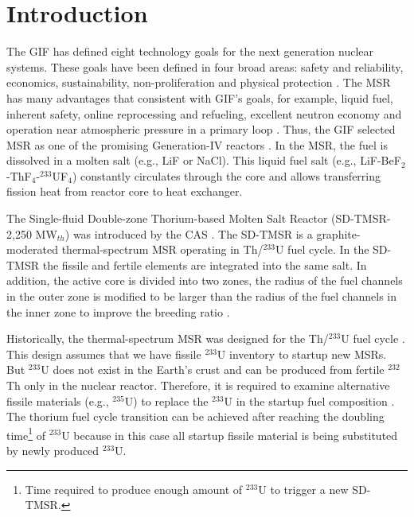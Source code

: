 \section{Introduction}
The \gls{GIF} has defined eight technology goals for the next generation
nuclear systems. These goals have been defined in four broad areas: safety and reliability, economics, sustainability, non-proliferation and physical protection \cite{doe2002technology}. The \gls{MSR} has many advantages that consistent
with \gls{GIF}'s goals, for example, liquid fuel, inherent safety, online
reprocessing and refueling, excellent neutron economy and operation near
atmospheric
pressure in a primary loop \cite{siemer2015molten,rosenthal1970molten}.
Thus, the \gls{GIF} selected \gls{MSR} as one of the promising Generation-IV
reactors \cite{doe2002technology,pioro2016handbook}.
In the \gls{MSR}, the fuel is dissolved in a molten salt (e.g., LiF or NaCl).
This liquid fuel salt (e.g., LiF-BeF$_2$-ThF$_4$-$^{233}$UF$_4$) constantly
circulates through the core and allows transferring fission heat from reactor
core to heat exchanger.

The Single-fluid Double-zone Thorium-based Molten Salt Reactor (SD-TMSR-2,250
MW$_{th}$) was introduced by the \gls{CAS} \cite{li_optimization_2018}. The
SD-TMSR
is a graphite-moderated thermal-spectrum \gls{MSR} operating in Th/$^{233}$U
fuel cycle. In the SD-TMSR the fissile and fertile elements are integrated
into the same salt. In addition, the active core is divided into two zones,
the radius of the fuel channels in the outer zone is modified to be larger
than the radius of the fuel channels in the inner zone to improve the breeding
ratio \cite{nuttin2005potential,li_optimization_2018}.

Historically, the thermal-spectrum \gls{MSR} was designed for the Th/$^{233}$U
fuel cycle \cite{rykhlevskii2019modeling,nuttin2005potential,
merle2004scenarios,rosenthal1970molten}. This design assumes that we have
fissile $^{233}$U inventory to startup new \glspl{MSR}. But $^{233}$U does not
exist in the Earth's crust and can be produced from fertile $^{232}$Th only in
the nuclear reactor. Therefore, it is required to examine alternative fissile
materials (e.g., $^{235}$U) to replace the $^{233}$U in the startup fuel
composition \cite{betzler2016modeling,zou2018transition}. The thorium fuel
cycle transition can be achieved after reaching the doubling
time\footnote{Time required to produce enough amount of $^{233}$U to trigger a
new SD-TMSR.} of $^{233}$U because in this case all startup fissile material
is being substituted by newly produced $^{233}$U.

